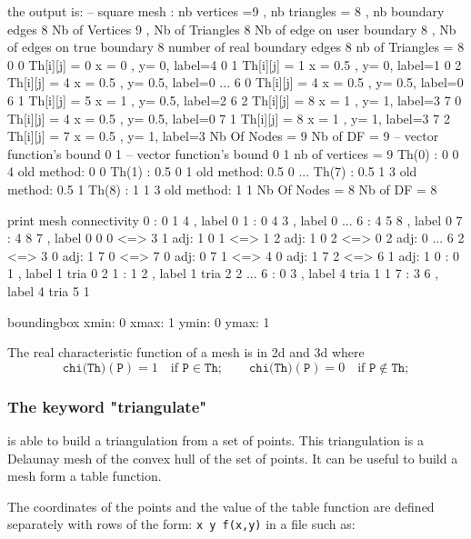 \documentclass[a4paper,twoside,12pt]{book}
\begin{document}
\eFF
the output is:
\bFF
 -- square mesh : nb vertices  =9 ,  nb triangles = 8 ,  nb boundary edges 8
    Nb of Vertices 9 ,  Nb of Triangles 8
    Nb of edge on user boundary  8 ,  Nb of edges on true boundary  8
 number of real boundary edges 8
 nb of Triangles = 8
0 0 Th[i][j] = 0  x = 0 , y= 0,  label=4
0 1 Th[i][j] = 1  x = 0.5 , y= 0,  label=1
0 2 Th[i][j] = 4  x = 0.5 , y= 0.5,  label=0
...
6 0 Th[i][j] = 4  x = 0.5 , y= 0.5,  label=0
6 1 Th[i][j] = 5  x = 1 , y= 0.5,  label=2
6 2 Th[i][j] = 8  x = 1 , y= 1,  label=3
7 0 Th[i][j] = 4  x = 0.5 , y= 0.5,  label=0
7 1 Th[i][j] = 8  x = 1 , y= 1,  label=3
7 2 Th[i][j] = 7  x = 0.5 , y= 1,  label=3
 Nb Of Nodes = 9
 Nb of DF = 9
 -- vector function's bound  0 1
 -- vector function's bound  0 1
 nb of vertices = 9
Th(0) : 0 0 4       old method: 0 0
Th(1) : 0.5 0 1       old method: 0.5 0
...
Th(7) : 0.5 1 3       old method: 0.5 1
Th(8) : 1 1 3       old method: 1 1
 Nb Of Nodes = 8
 Nb of DF = 8

 print mesh connectivity
0 :  0 1 4 , label  0
1 :  0 4 3 , label  0
...
6 :  4 5 8 , label  0
7 :  4 8 7 , label  0
0 0 <=>  3 1  adj: 1
0 1 <=>  1 2  adj: 1
0 2 <=>  0 2  adj: 0
...
6 2 <=>  3 0  adj: 1
7 0 <=>  7 0  adj: 0
7 1 <=>  4 0  adj: 1
7 2 <=>  6 1  adj: 1
0 : 0 1 , label 1 tria  0 2
1 : 1 2 , label 1 tria  2 2
...
6 : 0 3 , label 4 tria  1 1
7 : 3 6 , label 4 tria  5 1

 boundingbox  xmin: 0 xmax: 1 ymin: 0 ymax: 1
\eFF

The real characteristic function of a mesh  is   
in 2d and 3d  where
\begin{equation}
\texttt{chi(Th)}(\texttt{P})=1\quad\textrm{if }\texttt{P}\in \texttt{Th};\qquad
\texttt{chi(Th)}(\texttt{P})=0\quad\textrm{if }\texttt{P}\not\in \texttt{Th};
\end{equation}

\subsubsection{The keyword "triangulate"}

\freefempp is able to build a triangulation from a set of points. This
triangulation is a Delaunay mesh of the convex hull of the set of points.
It can be useful to build a mesh form a table function.

The coordinates of the points and the value of the table function
are defined separately with rows of the form: \texttt{x y f(x,y)}
in a file such as:
\end{document}
